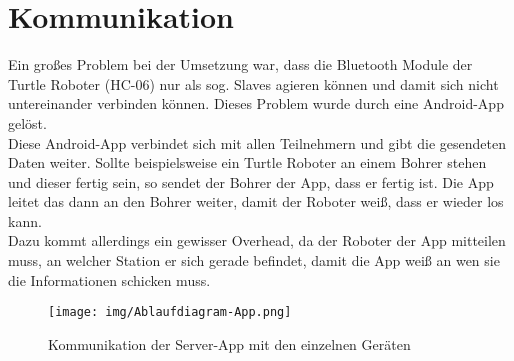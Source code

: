 \section{Kommunikation}
Ein großes Problem bei der Umsetzung war, dass die Bluetooth Module der Turtle Roboter (HC-06) nur als sog. Slaves agieren können und damit sich nicht untereinander verbinden können. Dieses Problem wurde durch eine Android-App gelöst.\\
Diese Android-App verbindet sich mit allen Teilnehmern und gibt die gesendeten Daten weiter. Sollte beispielsweise ein Turtle Roboter an einem Bohrer stehen und dieser fertig sein, so sendet der Bohrer der App, dass er fertig ist. Die App leitet das dann an den Bohrer weiter, damit der Roboter weiß, dass er wieder los kann.\\
Dazu kommt allerdings ein gewisser Overhead, da der Roboter der App mitteilen muss, an welcher Station er sich gerade befindet, damit die App weiß an wen sie die Informationen schicken muss.
\begin{figure}[h]
\begin{center}
\texttt{[image: img/Ablaufdiagram-App.png]}
\caption{Kommunikation der Server-App mit den einzelnen Geräten}
\end{center}
\end{figure}
